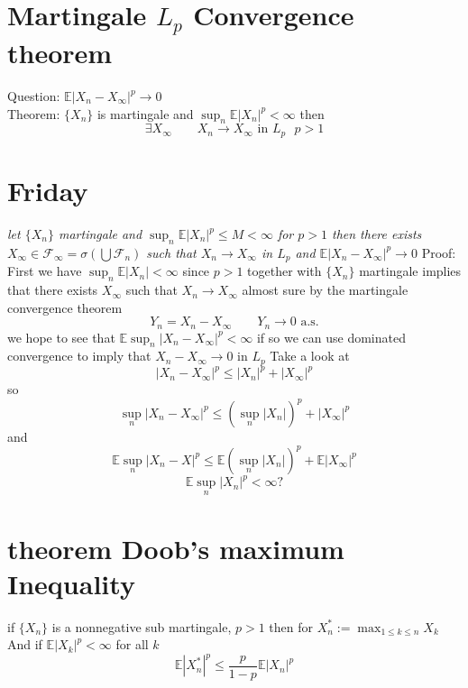 \documentclass[11pt]{article}
\begin{document}
\section{ Martingale $L_p$ Convergence theorem}
Question: $ \mathbb{E}|X_n - X_\infty|^{p} \rightarrow 0$ \\
Theorem: $\{X_n\}$ is martingale and $\sup_n \mathbb{E} |X_n|^{p}< \infty$ then
\[
    \exists X_ \infty \qquad    X_n \rightarrow X_{\infty} \text{ in $L_p$ } p > 1
\] 

\section{Friday}
\emph{
    let $\{X_n\}$ martingale and  $\sup_n \mathbb{E}|X_n|^{p} \le M < \infty$ for $p > 1$ then
    there exists  $X_{\infty} \in \mathcal{F}_\infty = \sigma(\bigcup \mathcal{F}_n)$ such that $X_n \rightarrow X_{\infty}$ in $L_p$
    and  $ \mathbb{E}|X_n - X_\infty|^{p } \rightarrow 0$
}
Proof: First we have $\sup_n \mathbb{E}|X_n| < \infty$ since $p > 1$
together with  $\{X_n\}$ martingale implies that there exists  $X_\infty$ such that $X_n \rightarrow X_\infty$ almost sure by the martingale convergence theorem
\[
    Y_n = X_n - X_\infty \qquad Y_n \rightarrow 0 \text{ a.s.}
\] 
we hope to see that $ \mathbb{E}\sup_n |X_n - X_\infty|^{p} < \infty$ if so we can use dominated convergence to imply that $X_n - X_\infty \rightarrow 0$ in $L_p$
Take a look at
 \[
|X_n - X_\infty|^{p} \le  |X_n|^{p} + |X_\infty|^{p}
\] 
so
\[
\sup_n |X_n - X_\infty|^{p} \le (\sup_n |X_n|)^{p} + |X_\infty|^{p}
\] 
and
\[
\mathbb{E} \sup_n |X_n- X|^{p} \le \mathbb{E}(\sup_n |X_n|)^{p} + \mathbb{E}|X_\infty|^{p}
\] 
\[
\mathbb{E} \sup_n |X_n|^{p} < \infty ?
\] 
\section{theorem Doob's maximum Inequality}
if $\{X_n\}$ is a nonnegative sub martingale, $p > 1$ then for  $X_n^{*} := \max_{1 \le k \le n} X_k$ 
And if $ \mathbb{E}|X_k|^{p} < \infty$ for all $k$
\[
\mathbb{E}|X_n^{*}|^{p} \le \frac{p}{1-p} \mathbb{E}|X_n|^{p}
\] 
\end{document}
